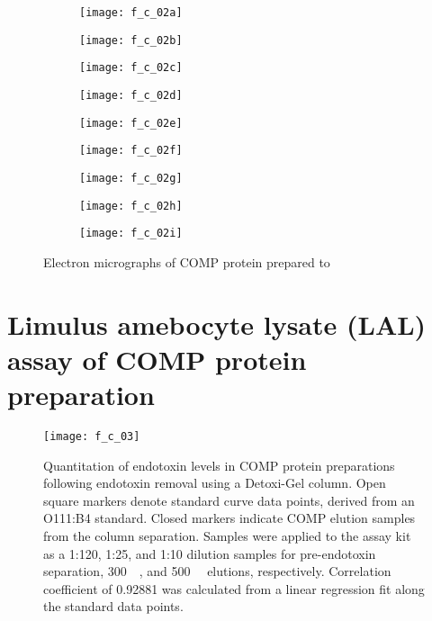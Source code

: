 \begin{figure}
    \centering
    \begin{subfigure}[b]{0.31\textwidth}
        \texttt{[image: f\_c\_02a]}
        \caption{}
    \end{subfigure}
    \begin{subfigure}[b]{0.31\textwidth}
        \texttt{[image: f\_c\_02b]}
        \caption{}
    \end{subfigure}
    \begin{subfigure}[b]{0.31\textwidth}
        \texttt{[image: f\_c\_02c]}
        \caption{}
    \end{subfigure}
    \begin{subfigure}[b]{0.31\textwidth}
        \texttt{[image: f\_c\_02d]}
        \caption{}
    \end{subfigure}
    \begin{subfigure}[b]{0.31\textwidth}
        \texttt{[image: f\_c\_02e]}
        \caption{}
    \end{subfigure}
    \begin{subfigure}[b]{0.31\textwidth}
        \texttt{[image: f\_c\_02f]}
        \caption{}
    \end{subfigure}
    \begin{subfigure}[b]{0.31\textwidth}
        \texttt{[image: f\_c\_02g]}
        \caption{}
    \end{subfigure}
    \begin{subfigure}[b]{0.31\textwidth}
        \texttt{[image: f\_c\_02h]}
        \caption{}
    \end{subfigure}
    \begin{subfigure}[b]{0.31\textwidth}
        \texttt{[image: f\_c\_02i]}
        \caption{}
    \end{subfigure}
    \caption{Electron micrographs of COMP protein prepared to }\label{fig:COMP_EM_3}
\end{figure}

\section{Limulus amebocyte lysate (LAL) assay of COMP protein preparation}
\label{sec:lal_assay}
\begin{figure}[h!] \centering \texttt{[image: f\_c\_03]}
    \caption{Quantitation of endotoxin levels in COMP protein preparations
        following endotoxin removal using a Detoxi-Gel column. Open square
        markers denote standard curve data points, derived from an
         O111:B4 standard. Closed markers indicate COMP elution
        samples from the column separation. Samples were applied to the assay
        kit as a 1:120, 1:25, and 1:10 dilution samples for pre-endotoxin
        separation, \SI{300}{\milli\moLar}, and \SI{500}{\milli\moLar} elutions,
    respectively. Correlation coefficient of 0.92881 was calculated from a
linear regression fit along the standard data points.}\label{fig:LAL_assay}
\end{figure}

